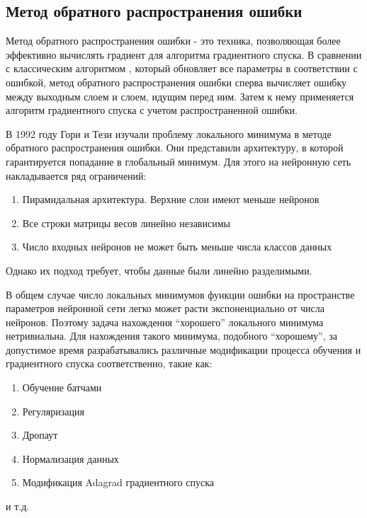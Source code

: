 \subsection{Метод обратного распространения ошибки}
Метод обратного распространения ошибки - это техника, позволяющая более эффективно вычислять градиент для алгоритма градиентного спуска. В сравнении с классическим алгоритмом  , который обновляет все параметры в соответствии с ошибкой, метод обратного распространения ошибки сперва вычисляет ошибку между выходным слоем и слоем, идущим перед ним. Затем к нему применяется алгоритм градиентного спуска с учетом распространенной ошибки.
\par
В 1992 году Гори и Тези изучали проблему локального минимума в методе обратного распространения ошибки. Они представили архитектуру, в которой гарантируется попадание в глобальный минимум. Для этого на нейронную сеть накладывается ряд ограничений:
\begin{enumerate}
	\item Пирамидальная архитектура. Верхние слои имеют меньше нейронов
	\item Все строки матрицы весов линейно независимы
	\item Число входных нейронов не может быть меньше числа классов данных
\end{enumerate}
Однако их подход требует, чтобы данные были линейно разделимыми. 
\par
В общем случае число локальных минимумов функции ошибки на пространстве параметров нейронной сети легко может расти экспоненциально от числа нейронов. Поэтому задача нахождения “хорошего” локального минимума нетривиальна. Для нахождения такого минимума, подобного “хорошему”, за допустимое время разрабатывались различные модификации процесса обучения и градиентного спуска соответственно, такие как:
\begin{enumerate}
	\item Обучение батчами
	\item Регуляризация
	\item Дропаут
	\item Нормализация данных
	\item Модификация Adagrad градиентного спуска
\end{enumerate}
и т.д.
